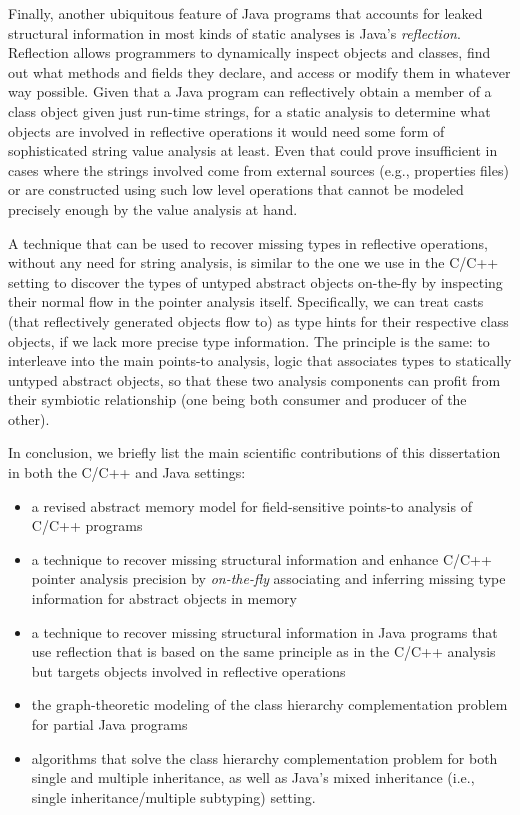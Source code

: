 Finally, another ubiquitous feature of Java programs that accounts for
leaked structural information in most kinds of static analyses is
Java's \emph{reflection}. Reflection allows programmers to
dynamically inspect objects and classes, find out what methods and
fields they declare, and access or modify them in whatever way
possible. Given that a Java program can reflectively obtain a member
of a class object given just run-time strings, for a static analysis
to determine what objects are involved in reflective operations it
would need some form of sophisticated string value analysis at
least. Even that could prove insufficient in cases where the strings
involved come from external sources (e.g., properties files) or are
constructed using such low level operations that cannot be modeled
precisely enough by the value analysis at hand.

A technique that can be used to recover missing types in reflective
operations, without any need for string analysis, is similar to the
one we use in the C/C++ setting to discover the types of untyped abstract
objects on-the-fly by inspecting their normal flow in the
pointer analysis itself. Specifically, we can treat casts (that
reflectively generated objects flow to) as type hints for their
respective class objects, if we lack more precise type
information. The principle is the same: to interleave into the main
points-to analysis, logic that associates types to statically untyped
abstract objects, so that these two analysis components can profit
from their symbiotic relationship (one being both consumer and
producer of the other).


In conclusion, we briefly list the main scientific contributions of
this dissertation in both the C/C++ and Java settings:
\begin{itemize}[--]
\item a revised abstract memory model for field-sensitive points-to
  analysis of C/C++ programs
\item a technique to recover missing structural information and
  enhance C/C++ pointer analysis precision by \emph{on-the-fly}
  associating and inferring missing type information for abstract
  objects in memory
\item a technique to recover missing structural information in Java
  programs that use reflection that is based on the same principle as
  in the C/C++ analysis but targets objects involved in reflective
  operations
\item the graph-theoretic modeling of the class hierarchy
  complementation problem for partial Java programs
\item algorithms that solve the class hierarchy complementation
  problem for both single and multiple inheritance, as well as Java's
  mixed inheritance (i.e., single inheritance/multiple subtyping)
  setting.
\end{itemize}



